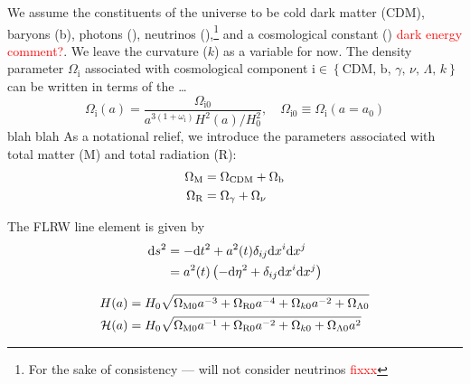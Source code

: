

We assume the constituents of the universe to be cold dark matter (CDM), baryons (b), photons (\textgamma), neutrinos (\textnu),\footnote{For the sake of consistency --- will not consider neutrinos \textcolor{red}{fixxx}} and a cosmological constant (\textLambda) \textcolor{red}{dark energy comment?}. We leave the curvature ($k$) as a variable for now. The density parameter $\Omega_{\mathrm{i}}$ associated with cosmological component $\mathrm{i} \in \left\{ \mathrm{CDM},\, \mathrm{b},\, \gamma,\, \nu,\, \Lambda,\, k \right\}$ can be written in terms of the \dots
\begin{equation}
    \Omega_\mathrm{i} \!\left(a\right) = \frac{\Omega_{\mathrm{i}0}}{a^{3(1+\omega_\mathrm{i})} H^2(a)/H_0^2},\quad \Omega_{\mathrm{i}0} \equiv \Omega_{\mathrm{i}}\!\left(a\!=\!a_0 \right)
\end{equation}
blah blah
As a notational relief, we introduce the parameters associated with total matter (M) and total radiation (R):
\begin{subequations}\label{sec1:theory:eq:density_params_idk}
    \begin{align}
        \OmgM[] &= \Omega_{\mathrm{CDM}} + \Omega_{\mathrm{b}} \label{sec1:theory:eq:xxx1} \\
        \OmgR[] &= \Omega_{\gamma } + \Omega_{\nu } \label{sec1:theory:eq:xxx2}
    \end{align}
\end{subequations}



The FLRW line element is given by
\begin{equation}\label{sec1:theory:eq:FLRW}
    \begin{split}
        \D s^2 &= -\D t^2 + a^2(t) \delta_{ij} \D x^i \D x^j  \\
                &= a^2(t) \left( -\D \eta^2 + \delta_{ij} \D x^i \D x^j \right) 
    \end{split}
\end{equation}





\begin{subequations}\label{sec1:theory:eq:Hubble_of_a}
    \begin{align}
        H(a) &= H_0 \sqrt{\OmgM a^{-3} + \OmgR a^{-4}  + \Omgk a^{-2} + \OmgL} \label{sec1:theory:eq:regular_Hubble} \\
        \mathcal{H}(a) &= H_0 \sqrt{\OmgM a^{-1} + \OmgR a^{-2}  + \Omgk + \OmgL a^{2}} \label{sec1:theory:eq:primed_Hubble}
    \end{align}
\end{subequations}


